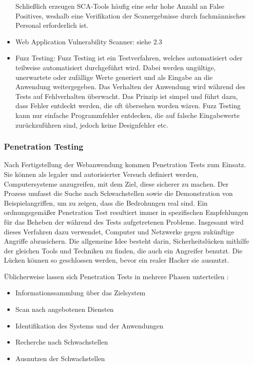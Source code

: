 \documentclass[12pt,oneside,a4paper,parskip]{scrbook}
\begin{document}
\begin{itemize}
    Schließlich erzeugen SCA-Tools häufig eine sehr hohe Anzahl an False Positives, weshalb eine
    Verifikation der Scanergebnisse durch fachmännisches Personal erforderlich ist.
    \item Web Application Vulnerability Scanner: siehe 2.3
    \item Fuzz Testing:
    Fuzz Testing ist ein Testverfahren, welches automatisiert oder teilweise automatisiert durchgeführt
    wird. Dabei werden ungültige, unerwartete oder zufällige Werte generiert und als Eingabe an die
    Anwendung weitergegeben. Das Verhalten der Anwendung wird während des Tests auf
    Fehlverhalten überwacht. Das Prinzip ist simpel und führt dazu, dass Fehler entdeckt werden, die
    oft übersehen worden wären. Fuzz Testing kann nur einfache Programmfehler entdecken, die auf
    falsche Eingabewerte zurückzuführen sind, jedoch keine Designfehler etc. \cite{BSI}
  \end{itemize}

    \subsubsection{Penetration Testing}
    Nach Fertigstellung der Webanwendung kommen Penetration Tests zum Einsatz. Sie können als legaler und autorisierter Versuch definiert werden, Computersysteme anzugreifen, mit dem Ziel, diese sicherer zu machen.
    Der Prozess umfasst die Suche nach Schwachstellen sowie die Demonstration von Beispielangriffen, um zu zeigen, dass die Bedrohungen real sind.
    Ein ordnungsgemäßer Penetration Test resultiert immer in spezifischen Empfehlungen für das
    Beheben der während des Tests aufgetretenen Probleme.
    Insgesamt wird dieses Verfahren dazu verwendet, Computer und Netzwerke gegen zukünftige Angriffe abzusichern. Die allgemeine Idee besteht darin, Sicherheitslücken mithilfe der gleichen Tools und Techniken zu finden, die auch ein Angreifer benutzt. Die Lücken können so geschlossen werden, bevor ein realer Hacker sie ausnutzt. \cite{engebretson}

    Üblicherweise lassen sich Penetration Tests in mehrere Phasen unterteilen \cite{BSI}:
    \begin{itemize}
      \item Informationssammlung über das Zielsystem
      \item Scan nach angebotenen Diensten
      \item Identifikation des Systems und der Anwendungen
      \item Recherche nach Schwachstellen
      \item Ausnutzen der Schwachstellen
    \end{itemize}
\end{document}
